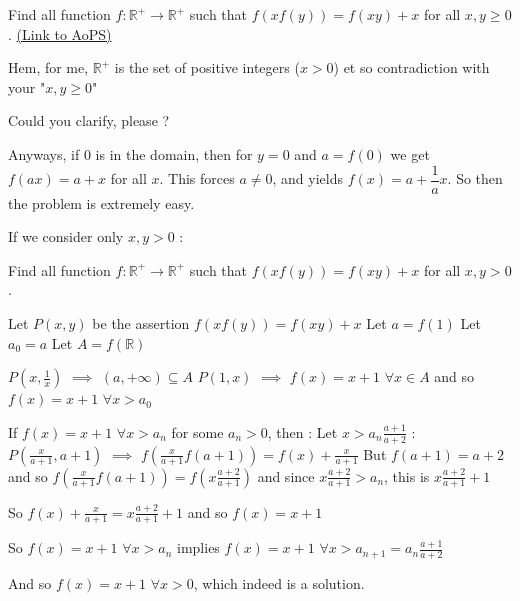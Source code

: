 \begin{problem}
	Find all function $f: \mathbb{R^+}\to\mathbb{R^+}$ such that $f(xf(y))=f(xy)+x$ for all $x,y{\ge}0$.
	\flushright \href{https://artofproblemsolving.com/community/c6h608311}{(Link to AoPS)}
\end{problem}



\begin{solution}
	Hem, for me, $\mathbb R^+$ is the set of positive integers ($x>0$) et so contradiction with your "$x,y\ge 0$"

Could you clarify, please ?
\end{solution}



\begin{solution}
	Anyways, if $0$ is in the domain, then for $y=0$ and $a=f(0)$ we get $f(ax)=a+x$ for all $x$. This forces $a\neq 0$, and yields $f(x) = a + \dfrac {1}{a}x$. 
So then the problem is extremely easy.
\end{solution}



\begin{solution}
	If we consider only $x,y>0$ :\begin{tcolorbox}Find all function $f: \mathbb{R^+}\to\mathbb{R^+}$ such that $f(xf(y))=f(xy)+x$ for all $x,y>0$.\end{tcolorbox}
Let $P(x,y)$ be the assertion $f(xf(y))=f(xy)+x$
Let $a=f(1)$
Let $a_0=a$
Let $A=f(\mathbb R)$

$P(x,\frac 1x)$ $\implies$ $(a,+\infty)\subseteq A$
$P(1,x)$ $\implies$ $f(x)=x+1$ $\forall x\in A$ and so $f(x)=x+1$ $\forall x>a_0$

If $f(x)=x+1$ $\forall x>a_n$ for some $a_n>0$, then :
Let $x>a_n\frac{a+1}{a+2}$ : $P(\frac x{a+1},a+1)$ $\implies$ $f(\frac x{a+1}f(a+1))=f(x)+\frac x{a+1}$
But $f(a+1)=a+2$ and so $f(\frac x{a+1}f(a+1))=f(x\frac{a+2}{a+1})$ and since $x\frac{a+2}{a+1}>a_n$, this is $x\frac{a+2}{a+1}+1$

So $f(x)+\frac x{a+1}=x\frac{a+2}{a+1}+1$ and so $f(x)=x+1$

So $f(x)=x+1$ $\forall x>a_n$ implies $f(x)=x+1$ $\forall x>a_{n+1}=a_n\frac{a+1}{a+2}$

And so $\boxed{f(x)=x+1}$ $\forall x>0$, which indeed is a solution.
\end{solution}



